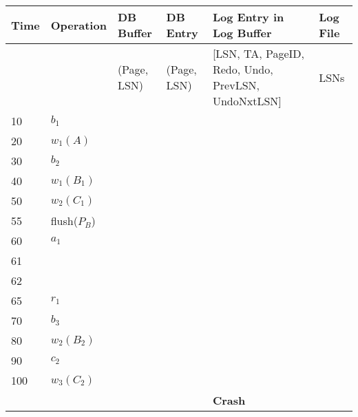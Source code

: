 \begin{center}
  \renewcommand{\arraystretch}{2.8}

  \begin{table}[H]
    \small
    \begin{tabular}{|l|l|l|l|l|l|}\hline
      Time & Operation    & DB Buffer              & DB Entry              & Log Entry in Log Buffer                                      & Log File               \\  \hline
           &              & (Page, LSN)            & (Page, LSN)           & [LSN, TA, PageID, Redo, Undo, PrevLSN, UndoNxtLSN]           & LSNs                   \\ \hline
      10   & $b_1$        &                        &                       &                     &                        \\ \hline
      20   & $w_1(A)$     &  &                       &      &                        \\ \hline
      30   & $b_2$        &                        &                       &                     &                        \\ \hline
      40   & $w_1(B_1)$   &  &                       &  &                        \\ \hline
      50   & $w_2(C_1)$   &  &                       &  &                        \\ \hline
      55   & flush($P_B$) &                        &  &                                                              &    \\ \hline
      60   & $a_1$        &                        &                       &                &                        \\ \hline
      61   &              &  &                       &   &                        \\ \hline
      62   &              &  &                       &     &                        \\ \hline
      65   & $r_1$        &                        &                       &                  &      \\ \hline
      70   & $b_3$        &                        &                       &                     &                        \\ \hline
      80   & $w_2(B_2)$   &  &                       &  &                        \\ \hline
      90   & $c_2$        &                        &                       &               &     \\ \hline
      100  & $w_3(C_2)$   &  &                       &  &                        \\ \hline
           &              &                        &                       & \textbf{Crash}                                               &                        \\ \hline
    \end{tabular}
  \end{table}
\end{center}

